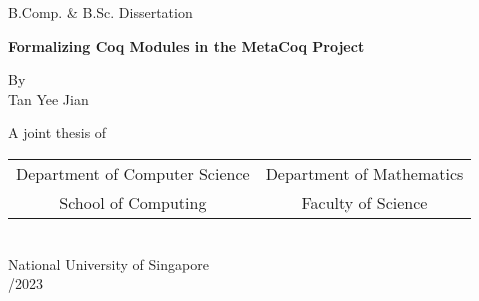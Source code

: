 \begin{titlepage}
  \begin{center}
    \large B.Comp. \& B.Sc. Dissertation


    \huge\textbf{Formalizing Coq Modules in the MetaCoq Project} 


    \large By\\
    \medskip Tan Yee Jian



    A joint thesis of\\\medskip
    \begin{tabular}{ c c }
      Department of Computer Science & Department of Mathematics \\
      School of Computing & Faculty of Science \\
    \end{tabular}\\\medskip
    National University of Singapore\\/2023

  \end{center}
\end{titlepage}


